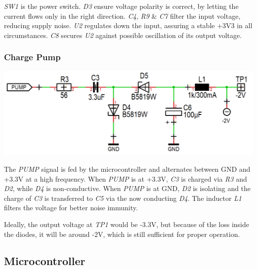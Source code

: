 \documentclass{scrartcl}
\begin{document}
\emph{SW1} is the power switch. \emph{D3} ensure voltage polarity is correct, by letting the current flows only in the right direction. \emph{C4}, \emph{R9} \& \emph{C7} filter the input voltage, reducing supply noise. \emph{U2} regulates down the input, assuring a stable +3V3 in all circumstances. \emph{C8} secures \emph{U2} against possible oscillation of its output voltage.

\subsubsection{Charge Pump}

\begin{center}
    \includegraphics[scale=0.3]{assets/schema-pump.png}
\end{center}

The \emph{PUMP} signal is fed by the microcontroller and alternates between GND and +3.3V at a high frequency. When \emph{PUMP} is at +3.3V, \emph{C3} is charged via \emph{R3} and \emph{D2}, while \emph{D4} is non-conductive. When \emph{PUMP} is at GND, \emph{D2} is isolating and the charge of \emph{C3} is transferred to \emph{C5} via the now conducting \emph{D4}. The inductor \emph{L1} filters the voltage for better noise immunity.

Ideally, the output voltage at \emph{TP1} would be -3.3V, but because of the loss inside the diodes, it will be around -2V, which is still sufficient for proper operation.

\subsection{Microcontroller}
\end{document}
